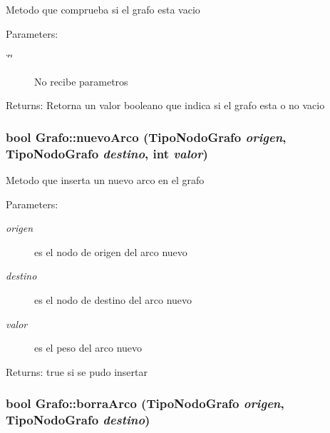 Metodo que comprueba si el grafo esta vacio \begin{Desc}
\item[Parameters:]
\begin{description}
\item[{\em \char`\"{}\char`\"{}}]No recibe parametros \end{description}
\end{Desc}
\begin{Desc}
\item[Returns:]Retorna un valor booleano que indica si el grafo esta o no vacio \end{Desc}
\hypertarget{classGrafo_ed8619656de5d16de0add75e3497e23e}{
\subsubsection[nuevoArco]{\setlength{\rightskip}{0pt plus 5cm}bool Grafo::nuevoArco (TipoNodoGrafo {\em origen}, \/  TipoNodoGrafo {\em destino}, \/  int {\em valor})}}
\label{classGrafo_ed8619656de5d16de0add75e3497e23e}


Metodo que inserta un nuevo arco en el grafo \begin{Desc}
\item[Parameters:]
\begin{description}
\item[{\em origen}]es el nodo de origen del arco nuevo \item[{\em destino}]es el nodo de destino del arco nuevo \item[{\em valor}]es el peso del arco nuevo \end{description}
\end{Desc}
\begin{Desc}
\item[Returns:]true si se pudo insertar \end{Desc}
\hypertarget{classGrafo_577730ec1abd068092a3c0947756bf3e}{
\subsubsection[borraArco]{\setlength{\rightskip}{0pt plus 5cm}bool Grafo::borraArco (TipoNodoGrafo {\em origen}, \/  TipoNodoGrafo {\em destino})}}
\label{classGrafo_577730ec1abd068092a3c0947756bf3e}


